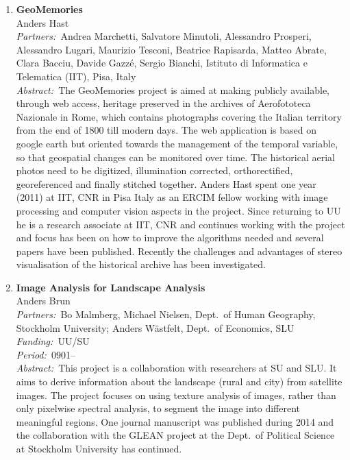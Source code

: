 \documentclass[10pt, a4paper]{article}
\newcommand{\aabstract}[1]{\emph{Abstract:~}#1}
\newcommand{\ffunding}[1]{\emph{Funding:~}#1\\}
\newcommand{\ppartners}[1]{\emph{Partners:~}#1\\}
\newcommand{\pperiod}[1]{\emph{Period:~}#1\\}
\begin{document}
{\begin{enumerate}
\item
\label{proj:geomemories}
\textbf{GeoMemories}\\
Anders Hast\\
\ppartners{Andrea Marchetti, Salvatore Minutoli, Alessandro Prosperi, Alessandro Lugari, Maurizio Tesconi, Beatrice Rapisarda, Matteo Abrate, Clara Bacciu, Davide Gazz\'e, Sergio Bianchi, Istituto di Informatica e Telematica (IIT), Pisa, Italy}
\aabstract{The GeoMemories project is aimed at making publicly available, through web access, heritage preserved in the archives of Aerofototeca Nazionale in Rome, which contains photographs covering the Italian territory from the end of 1800 till modern days. The web application is based on google earth but oriented towards the management of the temporal variable, so that geospatial changes can be monitored over time. The historical aerial photos need to be digitized, illumination corrected, orthorectified, georeferenced and finally stitched together. Anders Hast spent one year (2011) at IIT, CNR in Pisa Italy as an ERCIM fellow working with image processing and computer vision aspects in the project. Since returning to UU he is a research associate at IIT, CNR and continues working with the project and focus has been on how to improve the algorithms needed and several papers have been published. Recently the challenges and advantages of stereo visualisation of the historical archive has been investigated.}


\item \textbf{Image Analysis for Landscape Analysis}\\
Anders Brun\\
\ppartners{Bo Malmberg, Michael Nielsen, Dept.~of Human Geography, Stockholm University; Anders W\"{a}stfelt, Dept.~of Economics, SLU}
\ffunding{UU/SU}
\pperiod{0901--}
\aabstract{This project is a collaboration with researchers at SU and SLU. It aims to derive information about the landscape (rural and city) from satellite images. The project focuses on using texture analysis of images, rather than only pixelwise spectral analysis, to segment the image into different meaningful regions. One journal manuscript was published during 2014 and the collaboration with the GLEAN project at the Dept.~of Political Science at Stockholm University has continued.}


\end{enumerate}}
\end{document}
